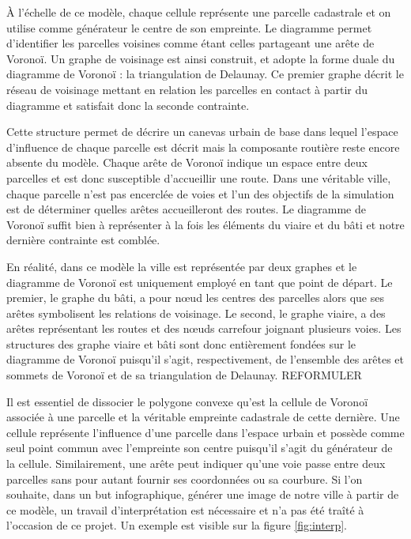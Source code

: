 \documentclass[12pt]{article}
\begin{document}
À l'échelle de ce modèle, chaque cellule représente une parcelle
cadastrale et on utilise comme générateur le centre de son
empreinte. Le diagramme permet d'identifier les parcelles voisines
comme étant celles partageant une arête de Voronoï. Un graphe de
voisinage est ainsi construit, et adopte la forme duale du diagramme
de Voronoï : la triangulation de Delaunay. Ce premier graphe décrit le
réseau de voisinage mettant en relation les parcelles en contact à
partir du diagramme et satisfait donc la seconde contrainte.

Cette structure permet de décrire un canevas urbain de base dans
lequel l'espace d'influence de chaque parcelle est décrit mais la
composante routière reste encore absente du modèle. Chaque arête de
Voronoï indique un espace entre deux parcelles et est donc susceptible
d'accueillir une route. Dans une véritable ville, chaque parcelle
n'est pas encerclée de voies et l'un des objectifs de la simulation
est de déterminer quelles arêtes accueilleront des routes. Le
diagramme de Voronoï suffit bien à représenter à la fois les éléments
du viaire et du bâti et notre dernière contrainte est comblée.

En réalité, dans ce modèle la ville est représentée par deux graphes
et le diagramme de Voronoï est uniquement employé en tant que point de
départ. Le premier, le graphe du bâti, a pour n\oe ud les centres des
parcelles alors que ses arêtes symbolisent les relations de
voisinage. Le second, le graphe viaire, a des arêtes représentant les
routes et des n\oe uds carrefour joignant plusieurs voies. Les
structures des graphe viaire et bâti sont donc entièrement fondées sur
le diagramme de Voronoï puisqu'il s'agit, respectivement, de
l'ensemble des arêtes et sommets de Voronoï et de sa triangulation de
Delaunay. REFORMULER

Il est essentiel de dissocier le polygone convexe qu'est la cellule de
Voronoï associée à une parcelle et la véritable empreinte cadastrale
de cette dernière. Une cellule représente l'influence d'une parcelle
dans l'espace urbain et possède comme seul point commun avec
l'empreinte son centre puisqu'il s'agit du générateur de la
cellule. Similairement, une arête peut indiquer qu'une voie passe
entre deux parcelles sans pour autant fournir ses coordonnées ou sa
courbure. Si l'on souhaite, dans un but infographique, générer une
image de notre ville à partir de ce modèle, un travail
d'interprétation est nécessaire et n'a pas été traîté à l'occasion de
ce projet. Un exemple est visible sur la figure \ref{fig:interp}.
\end{document}
